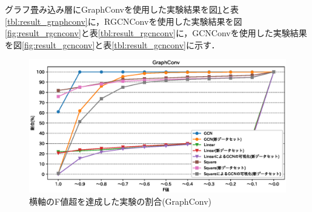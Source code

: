 グラフ畳み込み層にGraphConvを使用した実験結果を図\ref{fig:result_graphconv}と表\ref{tbl:result_graphconv}に，RGCNConvを使用した実験結果を図\ref{fig:result_rgcnconv}と表\ref{tbl:result_rgcnconv}に，GCNConvを使用した実験結果を図\ref{fig:result_gcnconv}と表\ref{tbl:result_gcnconv}に示す．

\begin{figure}[tb]
  \centering
  \includegraphics[scale=0.7]{fig/fig-exp_GraphConv.eps}
  \caption{横軸のF値超を達成した実験の割合(GraphConv)}\label{fig:result_graphconv}
\end{figure}

